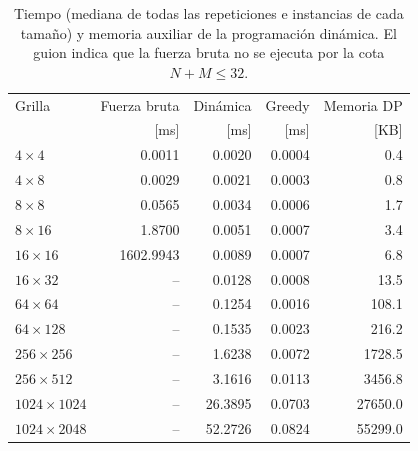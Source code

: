 \begin{table}[H]
\centering
\small
\begin{tabular}{lrrrr}
\hline
Grilla & Fuerza bruta & Dinámica & Greedy & Memoria DP \\
{} & [ms] & [ms] & [ms] & [KB] \\
\hline
$4 \times 4$ & 0.0011 & 0.0020 & 0.0004 & 0.4 \\
$4 \times 8$ & 0.0029 & 0.0021 & 0.0003 & 0.8 \\
$8 \times 8$ & 0.0565 & 0.0034 & 0.0006 & 1.7 \\
$8 \times 16$ & 1.8700 & 0.0051 & 0.0007 & 3.4 \\
$16 \times 16$ & 1602.9943 & 0.0089 & 0.0007 & 6.8 \\
$16 \times 32$ & -- & 0.0128 & 0.0008 & 13.5 \\
$64 \times 64$ & -- & 0.1254 & 0.0016 & 108.1 \\
$64 \times 128$ & -- & 0.1535 & 0.0023 & 216.2 \\
$256 \times 256$ & -- & 1.6238 & 0.0072 & 1728.5 \\
$256 \times 512$ & -- & 3.1616 & 0.0113 & 3456.8 \\
$1024 \times 1024$ & -- & 26.3895 & 0.0703 & 27650.0 \\
$1024 \times 2048$ & -- & 52.2726 & 0.0824 & 55299.0 \\
\hline
\end{tabular}
\caption{Tiempo (mediana de todas las repeticiones e instancias de cada tamaño) y memoria auxiliar de la programación dinámica. El guion indica que la fuerza bruta no se ejecuta por la cota $N+M \leq 32$.}
\label{tab:grid_tiempos}
\end{table}
